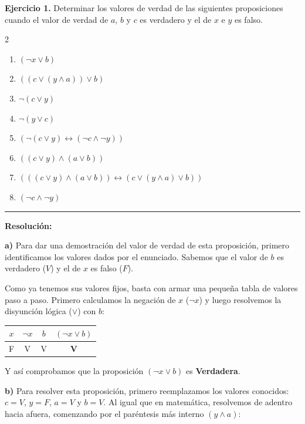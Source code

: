 \hypertarget{ej1}{}
\noindent \textbf{Ejercicio 1.} Determinar los valores de verdad de las siguientes proposiciones cuando el valor de verdad de $a$, $b$ y $c$ es verdadero y el de $x$ e $y$ es falso.

\begin{multicols}{2}
\begin{enumerate}[label=\alph*)]
    \item $(\neg x \vee b)$
    \item $((c \vee (y \wedge a)) \vee b)$
    \item $\neg(c \vee y)$
    \item $\neg(y \vee c)$
    \item $(\neg(c \vee y) \leftrightarrow (\neg c \wedge \neg y))$
    \item $((c \vee y) \wedge (a \vee b))$
    \item $(((c \vee y) \wedge (a \vee b)) \leftrightarrow (c \vee (y \wedge a) \vee b))$
    \item $(\neg c \wedge \neg y)$
\end{enumerate}
\end{multicols}

\vspace{0.2cm}
{\color{gray}\hrule}
\vspace{0.4cm}

\textbf{Resolución:}

\textbf{a)} Para dar una demostración del valor de verdad de esta proposición, primero identificamos 
los valores dados por el enunciado. Sabemos que el valor de $b$ es verdadero ($V$) y el de $x$ es falso ($F$).

Como ya tenemos sus valores fijos, basta con armar una pequeña tabla de valores paso a paso. Primero calculamos la negación de $x$ ($\neg x$) y luego resolvemos la disyunción lógica ($\vee$) con $b$:

\begin{center}
\begin{tabular}{|c|c|c|c|}
\hline
$x$ & $\neg x$ & $b$ & $(\neg x \vee b)$ \\
\hline
F & V & V & \textbf{V} \\
\hline
\end{tabular}
\end{center}

Y así comprobamos que la proposición $(\neg x \vee b)$ es \textbf{Verdadera}.

\vspace{0.4cm}
\textbf{b)} Para resolver esta proposición, primero reemplazamos los valores conocidos: $c=V$, $y=F$, $a=V$ y $b=V$. Al igual que en matemática, resolvemos de adentro hacia afuera, comenzando por el paréntesis más interno $(y \wedge a)$:

